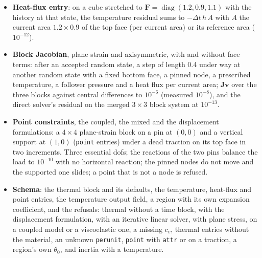 \documentclass[11pt]{article}
\newcommand{\diag}{\operatorname{diag}}
\newcommand{\bF}{\bm{F}}
\DeclareRobustCommand{\code}[1]{{\def\_{\textunderscore\allowbreak}\texttt{#1}}}
\begin{document}
\begin{itemize}[nosep]
    solution of the heat equation: errors $-2.7\times10^{-3}$ with 100 steps
    and $-1.3\times10^{-3}$ with 200 (the implicit Euler method is first
    order in the step; the check asks for a halving and for $4\times10^{-3}$).
  \item \textbf{Heat-flux entry}: on a cube stretched to
    $\bF = \diag(1.2, 0.9, 1.1)$ with the history at that state, the
    temperature residual sums to $-\Delta t\,h\,A$ with $A$ the current area
    $1.2\times0.9$ of the top face (per current area) or its reference area
    ($10^{-12}$).
  \item \textbf{Block Jacobian}, plane strain and axisymmetric, with and
    without face terms: after an accepted random state, a step of length 0.4
    under way at another random state with a fixed bottom face, a pinned
    node, a prescribed temperature, a follower pressure and a heat flux per
    current area; $\bm J\bm v$ over the three blocks against central
    differences to $10^{-6}$ (measured $10^{-8}$), and the direct solver's
    residual on the merged $3\times3$ block system at $10^{-13}$.
  \item \textbf{Point constraints}, the coupled, the mixed and the
    displacement formulations: a $4\times4$ plane-strain block on a pin at
    $(0, 0)$ and a vertical support at $(1, 0)$ (\code{point} entries) under
    a dead traction on its top face in two increments.  Three essential
    dofs; the reactions of the two pins balance the load to $10^{-10}$ with
    no horizontal reaction; the pinned nodes do not move and the supported
    one slides; a point that is not a node is refused.
  \item \textbf{Schema}: the thermal block and its defaults, the
    temperature, heat-flux and point entries, the temperature output field,
    a region with its own expansion coefficient, and the refusals: thermal
    without a time block, with the displacement formulation, with an
    iterative linear solver, with plane stress, on a coupled model or a
    viscoelastic one, a missing $c_v$, thermal entries without the material,
    an unknown \code{per\_unit}, \code{point} with \code{attr} or on a
    traction, a region's own $\theta_0$, and inertia with a temperature.
\end{itemize}
\end{document}
